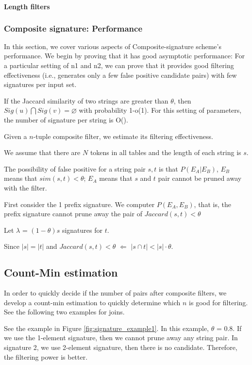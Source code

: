 \smallskip

\noindent \textbf{Length filters}


\subsubsection{Composite signature: Performance}

In this section, we cover various aspects of Composite-signature scheme's performance.
We begin by proving that it has good asymptotic performance: For a particular setting of n1 and n2, we can prove
that it provides good filtering effectiveness (i.e., generates only a few false positive candidate pairs) with few signatures per input set.

\begin{theorem} If the Jaccard similarity of two strings are greater than $\theta$, then $Sig(u) \bigcap Sig(v) = \varnothing$ with probability 1-o(1). For this setting of parameters, the number of signature per string is O().
\end{theorem}


Given a $n$-tuple composite filter, we estimate its filtering effectiveness.

We assume that there are $N$ tokens in all tables and the length of each string is $s$.

The possibility of false positive for a string pair $s, t$ is that $P(E_A | E_B)$, $E_B$ means that  $sim(s,t) < \theta$; $E_A$ means that $s$ and $t$ pair cannot be pruned away with the filter.

First consider the 1 prefix signature. We computer $P(E_A, E_B)$, that is, the prefix signature cannot prune away the pair of $Jaccard(s,t) < \theta$

Let $\lambda$ = $(1-\theta)s$ signatures for $t$.

Since $|s| = |t|$ and   $Jaccard(s,t) < \theta$ $\Longleftarrow$ $ |s \cap t| < |s| \cdot \theta$.

\subsection{Count-Min estimation}

In order to quickly decide if the number of pairs after composite filters, we develop a count-min estimation to quickly determine which $n$ is good for filtering. See the following two examples for joins.

See the example in Figure \ref{fig:signature_example1}. In this example, $\theta$ = 0.8. If we use the 1-element signature, then we cannot prune away any string pair. In signature 2, we use 2-element signature, then there is no candidate. Therefore, the filtering power is better.

